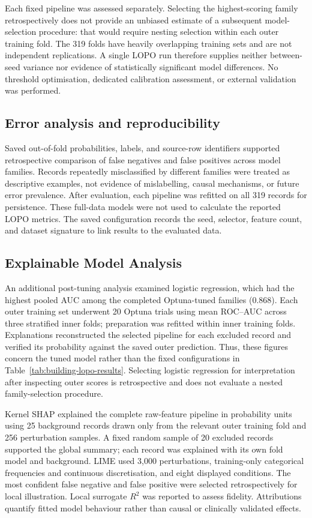 Each fixed pipeline was assessed separately. Selecting the highest-scoring family retrospectively does not provide an unbiased estimate of a subsequent model-selection procedure: that would require nesting selection within each outer training fold. The 319 folds have heavily overlapping training sets and are not independent replications. A single LOPO run therefore supplies neither between-seed variance nor evidence of statistically significant model differences. No threshold optimisation, dedicated calibration assessment, or external validation was performed.

\subsection{Error analysis and reproducibility}
Saved out-of-fold probabilities, labels, and source-row identifiers supported retrospective comparison of false negatives and false positives across model families. Records repeatedly misclassified by different families were treated as descriptive examples, not evidence of mislabelling, causal mechanisms, or future error prevalence. After evaluation, each pipeline was refitted on all 319 records for persistence. These full-data models were not used to calculate the reported LOPO metrics. The saved configuration records the seed, selector, feature count, and dataset signature to link results to the evaluated data.

\subsection{Explainable Model Analysis}
An additional post-tuning analysis examined logistic regression, which had the highest pooled AUC among the completed Optuna-tuned families (0.868). Each outer training set underwent 20 Optuna trials using mean ROC--AUC across three stratified inner folds; preparation was refitted within inner training folds. Explanations reconstructed the selected pipeline for each excluded record and verified its probability against the saved outer prediction. Thus, these figures concern the tuned model rather than the fixed configurations in Table~\ref{tab:building-lopo-results}. Selecting logistic regression for interpretation after inspecting outer scores is retrospective and does not evaluate a nested family-selection procedure.

Kernel SHAP \parencite{lundberg2017shap} explained the complete raw-feature pipeline in probability units using 25 background records drawn only from the relevant outer training fold and 256 perturbation samples. A fixed random sample of 20 excluded records supported the global summary; each record was explained with its own fold model and background. LIME \parencite{ribeiro2016lime} used 3,000 perturbations, training-only categorical frequencies and continuous discretisation, and eight displayed conditions. The most confident false negative and false positive were selected retrospectively for local illustration. Local surrogate $R^2$ was reported to assess fidelity. Attributions quantify fitted model behaviour rather than causal or clinically validated effects.
